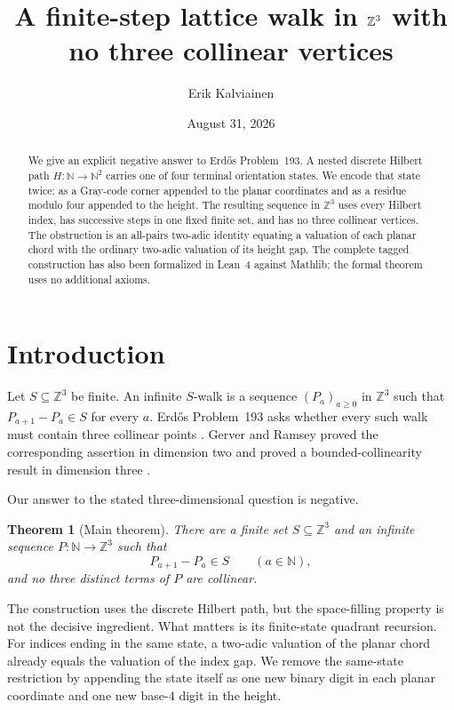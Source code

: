 \documentclass[11pt]{article}
\title{A finite-step lattice walk in $\Z^3$ with no three collinear vertices}
\author{Erik Kalviainen}
\date{August 31, 2026}
\newtheorem{theorem}{Theorem}[section]
\theoremstyle{definition}
\theoremstyle{remark}
\newcommand{\Z}{\mathbb Z}
\newcommand{\N}{\mathbb N}
\begin{document}
\maketitle

\begin{abstract}
We give an explicit negative answer to Erd\H{o}s Problem~193.  A nested
discrete Hilbert path $H\colon\N\to\N^2$ carries one of four terminal
orientation states.  We encode that state twice: as a Gray-code corner
appended to the planar coordinates and as a residue modulo four appended to
the height.  The resulting sequence in $\Z^3$ uses every Hilbert index, has
successive steps in one fixed finite set, and has no three collinear vertices.
The obstruction is an all-pairs two-adic identity equating a valuation of
each planar chord with the ordinary two-adic valuation of its height gap.
The complete tagged construction has also been formalized in Lean~4 against
Mathlib; the formal theorem uses no additional axioms.
\end{abstract}

\section{Introduction}

Let $S\subseteq\Z^3$ be finite.  An infinite $S$-walk is a sequence
$(P_a)_{a\geq 0}$ in $\Z^3$ such that $P_{a+1}-P_a\in S$ for every $a$.
Erd\H{o}s Problem~193 asks whether every such walk must contain three
collinear points \cite{Bloom193,GerverRamsey1979}.  Gerver and Ramsey proved
the corresponding assertion in dimension two and proved a bounded-collinearity
result in dimension three \cite{GerverRamsey1979}.

Our answer to the stated three-dimensional question is negative.

\begin{theorem}[Main theorem]\label{thm:main}
There are a finite set $S\subseteq\Z^3$ and an infinite sequence
$P\colon\N\to\Z^3$ such that
\[
  P_{a+1}-P_a\in S\qquad(a\in\N),
\]
and no three distinct terms of $P$ are collinear.
\end{theorem}

The construction uses the discrete Hilbert path, but the space-filling
property is not the decisive ingredient.  What matters is its finite-state
quadrant recursion.  For indices ending in the same state, a two-adic
valuation of the planar chord already equals the valuation of the index gap.
We remove the same-state restriction by appending the state itself as one
new binary digit in each planar coordinate and one new base-$4$ digit in the
height.
\end{document}
